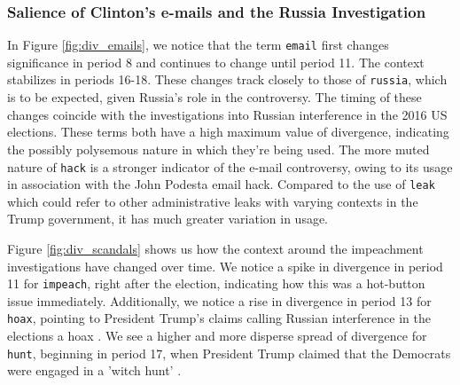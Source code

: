 


\subsubsection*{Salience of Clinton's e-mails and the Russia Investigation}

In Figure \ref{fig:div_emails}, we notice that the term \texttt{email} first changes significance in period 8 and continues to change until period 11. The context stabilizes in periods 16-18. These changes track closely to those of \texttt{russia}, which is to be expected, given Russia's role in the controversy. The timing of these changes coincide with the investigations into Russian interference in the 2016 US elections. These terms both have a high maximum value of divergence, indicating the possibly polysemous nature in which they're being used. The more muted nature of \texttt{hack} is a stronger indicator of the e-mail controversy, owing to its usage in association with the John Podesta email hack. Compared to the use of \texttt{leak} which could refer to other administrative leaks with varying contexts in the Trump government, it has much greater variation in usage. 

Figure \ref{fig:div_scandals} shows us how the context around the impeachment investigations have changed over time. We notice a spike in divergence in period 11 for \texttt{impeach}, right after the election, indicating how this was a hot-button issue immediately. Additionally, we notice a rise in divergence in period 13 for \texttt{hoax}, pointing to President Trump's claims calling Russian interference in the elections a hoax \citep{noauthor_trump_2019}. We see a higher and more disperse spread of divergence for \texttt{hunt}, beginning in period 17, when President Trump claimed that the Democrats were engaged in a 'witch hunt' \citep{noauthor_donald_nodate}. 

